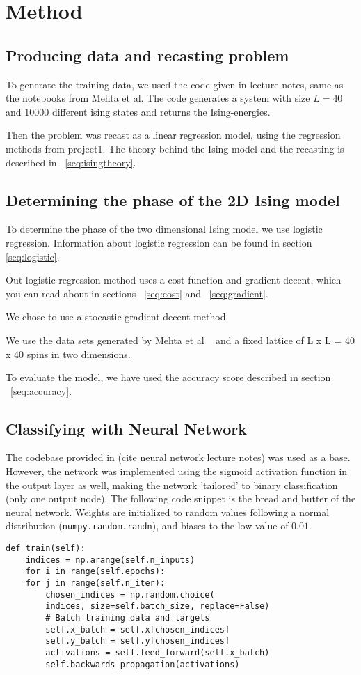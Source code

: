 \section{Method}

\subsection{Producing data and recasting problem}
To generate the training data, we used the code given in lecture notes,
same as the notebooks from Mehta et al.
The code generates a system with size \(L=40\) and \(10000\) different 
ising states and returns the Ising-energies. 

Then the problem was recast as a linear regression model, using 
the regression methods from project1. The theory behind 
the Ising model and the recasting is described in ~\ref{seq:isingtheory}.


\subsection{Determining the phase of the 2D Ising model}
To determine the phase of the two dimensional Ising model we use 
logistic regression. Information about logistic regression can be found 
in section \ref{seq:logistic}. 

Out logistic regression method uses a cost function 
and gradient decent, which you can read about 
in sections ~\ref{seq:cost} and ~\ref{seq:gradient}.

We chose to use a stocastic gradient decent method. 

We use the data sets generated by Mehta et al ~\cite{HighBias}
and a fixed lattice of L x L = 40 x 40 spins in two dimensions.

To evaluate the model, we have used the accuracy score described in 
section ~\ref{seq:accuracy}. 

\subsection{Classifying with Neural Network}
The codebase provided in (cite neural network lecture notes) was
used as a base. However, the network was implemented using the sigmoid
activation function in the output layer as well, making the network
'tailored' to binary classification (only one output node). 
The following code snippet is the bread and butter of the neural
network. Weights are initialized to random values following a
normal distribution (\lstinline{numpy.random.randn}), and biases
to the low value of $0.01$.
\begin{lstlisting}
def train(self):
    indices = np.arange(self.n_inputs)
    for i in range(self.epochs):
	for j in range(self.n_iter):
	    chosen_indices = np.random.choice(
		indices, size=self.batch_size, replace=False)
	    # Batch training data and targets
	    self.x_batch = self.x[chosen_indices]
	    self.y_batch = self.y[chosen_indices]
	    activations = self.feed_forward(self.x_batch)
	    self.backwards_propagation(activations)
\end{lstlisting}
